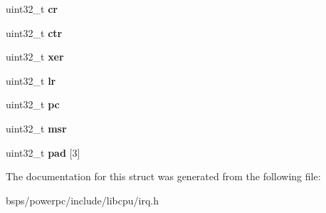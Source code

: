 \begin{DoxyCompactItemize}
uint32\+\_\+t {\bfseries cr}
\item 
\mbox{\label{structMPC5XX__Interrupt__frame_a9dfc3ef53e4e75148b35094ba1ef0758}} 
uint32\+\_\+t {\bfseries ctr}
\item 
\mbox{\label{structMPC5XX__Interrupt__frame_a4a0fb4bf35db3bb581ec39d4f4605fef}} 
uint32\+\_\+t {\bfseries xer}
\item 
\mbox{\label{structMPC5XX__Interrupt__frame_a99e93fc3949bc6dbd3f9c3e3e823f2d6}} 
uint32\+\_\+t {\bfseries lr}
\item 
\mbox{\label{structMPC5XX__Interrupt__frame_ab88486298e5c18b3e411c7b8381b067f}} 
uint32\+\_\+t {\bfseries pc}
\item 
\mbox{\label{structMPC5XX__Interrupt__frame_a82c2014587811441676f9330ee78e830}} 
uint32\+\_\+t {\bfseries msr}
\item 
\mbox{\label{structMPC5XX__Interrupt__frame_ae42d1bc8fcea662a0467e442ff0ca82d}} 
uint32\+\_\+t {\bfseries pad} \mbox{[}3\mbox{]}
\end{DoxyCompactItemize}


The documentation for this struct was generated from the following file\+:\begin{DoxyCompactItemize}
\item 
bsps/powerpc/include/libcpu/irq.\+h\end{DoxyCompactItemize}
